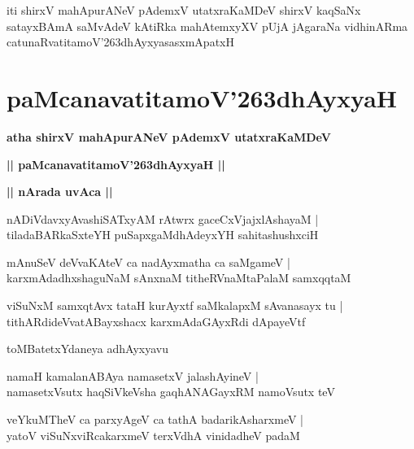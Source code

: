 \documentclass[twoside,12pt,openright]{book}
\def\S{\char'263}
\newcounter{shloka}[chapter]
\def\uvaca#1{\centerline{{\large\textbf{#1}}}}
\begin{document}
\begin{center}
iti shirxV mahApurANeV pAdemxV utatxraKaMDeV shirxV kaqSaNx  satayxBAmA saMvAdeV kAtiRka 
mahAtemxyXV pUjA jAgaraNa vidhinARma catunaRvatitamoV\S dhAyxyasasxmApatxH 
\end{center}

\chapter{paMcanavatitamoV\S dhAyxyaH}

\begin{center}
{\LARGE\bfseries atha shirxV mahApurANeV pAdemxV utatxraKaMDeV}
\end{center}

\begin{center}
{\LARGE\bfseries || paMcanavatitamoV\S dhAyxyaH || }
\end{center}

\uvaca{|| nArada uvAca ||}

\begin{shloka}%
nADiVdavxyAvashiSATxyAM rAtwrx gaceCxVjajxlAshayaM |\\
tiladaBARkaSxteYH puSapxgaMdhAdeyxYH sahitashushxciH 
\end{shloka}

\begin{shloka}%
mAnuSeV deVvaKAteV ca nadAyxmatha ca saMgameV |\\
karxmAdadhxshaguNaM sAnxnaM titheRVnaMtaPalaM samxqqtaM 
\end{shloka}

\begin{shloka}%
viSuNxM samxqtAvx tataH kurAyxtf saMkalapxM sAvanasayx tu |\\
tithARdideVvatABayxshacx karxmAdaGAyxRdi dApayeVtf
\end{shloka}

\begin{center}
toMBatetxYdaneya adhAyxyavu
\end{center}

\begin{shloka}%
namaH kamalanABAya namasetxV jalashAyineV |\\
namasetxVsutx haqSiVkeVsha gaqhANAGayxRM namoVsutx teV 
\end{shloka}

\begin{shloka}%
veYkuMTheV ca parxyAgeV ca tathA badarikAsharxmeV |\\
yatoV viSuNxviRcakarxmeV terxVdhA vinidadheV padaM 
\end{shloka}
\end{document}

